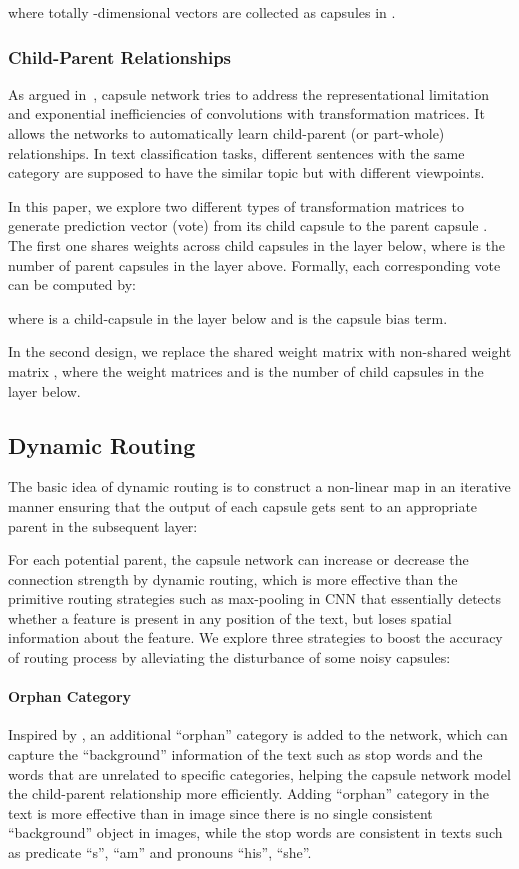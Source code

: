 \documentclass[11pt]{article}
\begin{document}
where totally  -dimensional vectors are collected as capsules in . 




\subsubsection{Child-Parent Relationships}
As argued in~\cite{sabour2017dynamic}, capsule network tries to address the representational limitation and exponential inefficiencies of convolutions with transformation matrices. It allows the networks to automatically learn child-parent (or part-whole) relationships. In text classification tasks, different sentences with the same category are supposed to have the similar topic but with different viewpoints.

In this paper, we explore two different types of transformation matrices to generate prediction vector (vote)  from its child capsule  to the parent capsule . The first one shares weights  across child capsules in the layer below, where  is the number of parent capsules in the layer above. Formally, each corresponding vote can be computed by:

where  is a child-capsule in the layer below and  is the capsule bias term. 

In the second design, we replace the shared weight matrix  with non-shared weight matrix ,
where the weight matrices  and  is the number of child capsules in the layer below.  




\subsection{Dynamic Routing}


The basic idea of dynamic routing is to construct a non-linear map in an iterative manner ensuring that the output of each capsule gets sent to an appropriate parent in the subsequent layer: 

For each potential parent, the capsule network can increase or decrease the connection strength by dynamic routing, which is more effective than the primitive routing strategies such as max-pooling in CNN that  essentially detects whether a feature is present in any position of the text, but loses spatial information about the feature. 
We explore three strategies to boost the accuracy of routing process by alleviating the disturbance of some noisy capsules:
\paragraph{Orphan Category} Inspired by , an additional ``orphan'' category is added to the network, which can capture the ``background'' information of the text such as stop words and the words that are unrelated to specific categories, helping the capsule network model the child-parent relationship more efficiently. Adding ``orphan'' category in the text is more effective than in image since there is no single consistent ``background'' object in images, while the stop words are consistent in texts such as predicate ``s'', ``am'' and pronouns ``his'', ``she''. 
\end{document}
